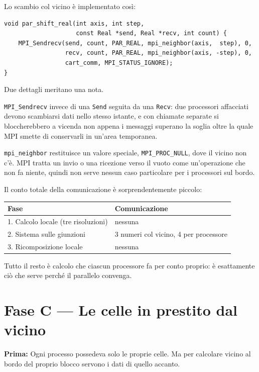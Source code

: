 \documentclass[11pt,a4paper]{article}
\newcommand{\prima}[1]{\par\smallskip\noindent\textbf{\color{scuro}Prima:} #1\par}
\newcommand{\cd}[1]{\texttt{\small #1}}
\begin{document}
Lo scambio col vicino è implementato così:

\begin{lstlisting}
void par_shift_real(int axis, int step,
                    const Real *send, Real *recv, int count) {
    MPI_Sendrecv(send, count, PAR_REAL, mpi_neighbor(axis,  step), 0,
                 recv, count, PAR_REAL, mpi_neighbor(axis, -step), 0,
                 cart_comm, MPI_STATUS_IGNORE);
}
\end{lstlisting}

Due dettagli meritano una nota.

\cd{MPI\_Sendrecv} invece di una \cd{Send} seguita da una \cd{Recv}: due
processori affacciati devono scambiarsi dati nello stesso istante, e con
chiamate separate si bloccherebbero a vicenda non appena i messaggi superano la
soglia oltre la quale MPI smette di conservarli in un'area temporanea.

\cd{mpi\_neighbor} restituisce un valore speciale, \cd{MPI\_PROC\_NULL}, dove il
vicino non c'è. MPI tratta un invio o una ricezione verso il vuoto come
un'operazione che non fa niente, quindi non serve nessun caso particolare per i
processori sul bordo.

\medskip
Il conto totale della comunicazione è sorprendentemente piccolo:

\begin{center}
\begin{tabular}{@{}L{7.2cm}L{7.2cm}@{}}
\toprule
\textbf{Fase} & \textbf{Comunicazione} \\
. Calcolo locale (tre risoluzioni) & nessuna \\
2. Sistema sulle giunzioni & 3 numeri col vicino, 4 per processore \\
3. Ricomposizione locale & nessuna \\
\bottomrule
\end{tabular}
\end{center}

\medskip
Tutto il resto è calcolo che ciascun processore fa per conto proprio: è
esattamente ciò che serve perché il parallelo convenga.

\section{Fase C --- Le celle in prestito dal vicino}

\prima{Ogni processo possedeva solo le proprie celle. Ma per calcolare vicino
al bordo del proprio blocco servono i dati di quello accanto.}
\end{document}
